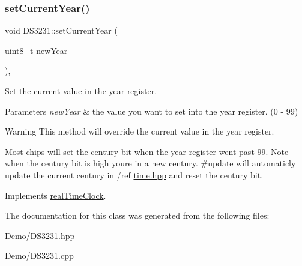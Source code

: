 \subsubsection{\texorpdfstring{set\+Current\+Year()}{setCurrentYear()}}
{\footnotesize\ttfamily void D\+S3231\+::set\+Current\+Year (\begin{DoxyParamCaption}\item[{uint8\+\_\+t}]{new\+Year }\end{DoxyParamCaption})\hspace{0.3cm}{\ttfamily [override]}, {\ttfamily [virtual]}}



Set the current value in the year register. 


\begin{DoxyParams}{Parameters}
{\em new\+Year} & the value you want to set into the year register. (0 -\/ 99) \\
\hline
\end{DoxyParams}
\begin{DoxyWarning}{Warning}
This method will override the current value in the year register. 

Most chips will set the century bit when the year register went past 99. Note when the century bit is high you\textquotesingle{}re in a new century. \#update will automaticly update the current century in /ref \mbox{\hyperlink{time_8hpp_source}{time.\+hpp}} and reset the century bit. 
\end{DoxyWarning}


Implements \mbox{\hyperlink{classreal_time_clock_a4d6e8056f52cea52bab5c635c0860c12}{real\+Time\+Clock}}.



The documentation for this class was generated from the following files\+:\begin{DoxyCompactItemize}
\item 
Demo/D\+S3231.\+hpp\item 
Demo/D\+S3231.\+cpp\end{DoxyCompactItemize}
